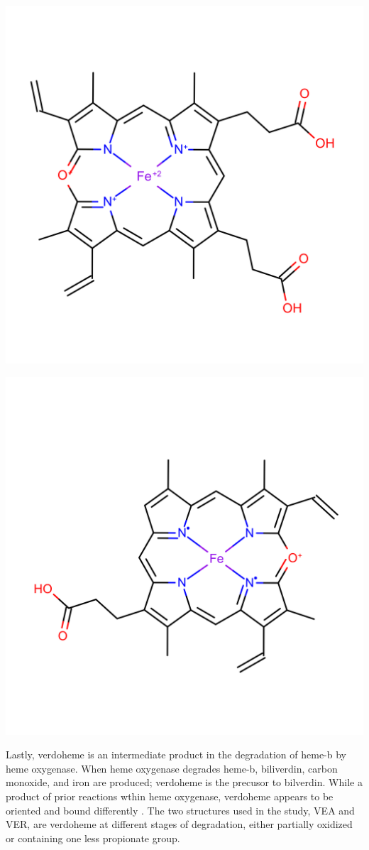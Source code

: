 \documentclass[a4paper, nobind]{templates/ociamthesis}
\let\origfigure\figure
\let\endorigfigure\endfigure
\renewenvironment{figure}[1][2] {
    \expandafter\origfigure\expandafter[H]
} {
    \endorigfigure
}
\begin{document}
\begin{figure}

{\centering \includegraphics[width=0.5\linewidth]{figures/VEA} 

}

\caption{Verdoheme, VEA}\label{fig:structVEA}
\end{figure}
\begin{figure}

{\centering \includegraphics[width=0.5\linewidth]{figures/VER} 

}

\caption{Verdoheme, VER}\label{fig:structVER}
\end{figure}

Lastly, verdoheme is an intermediate product in the degradation of heme-b by heme oxygenase. When heme oxygenase degrades heme-b, biliverdin, carbon monoxide, and iron are produced; verdoheme is the precusor to bilverdin\autocite{Lai2010,Sato2007}. While a product of prior reactions wthin heme oxygenase, verdoheme appears to be oriented and bound differently \autocite{Lad2004}. The two structures used in the study, VEA and VER, are verdoheme at different stages of degradation, either partially oxidized or containing one less propionate group.
\end{document}
